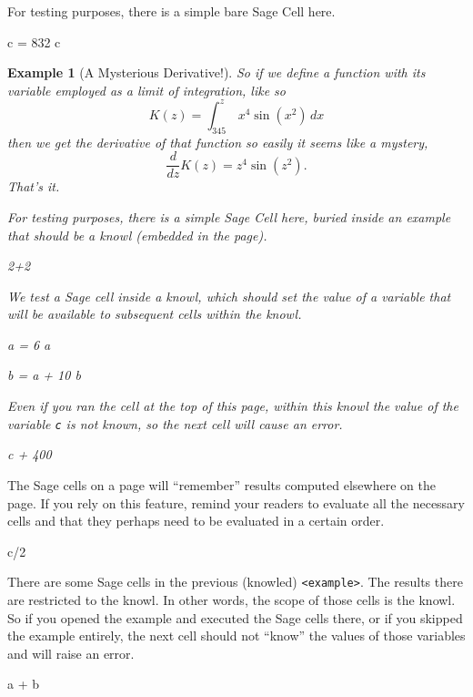 \documentclass{sn-jnl}
\theoremstyle{thmstyleone}%
\theoremstyle{thmstyletwo}%
\newtheorem{example}[theorem]{Example}
\theoremstyle{thmstylethree}%
\newcommand{\mono}[1]{\texttt{#1}}
\numberwithin{equation}{section}
\newcommand{\definiteintegral}[4]{\int_{#1}^{#2}\,#3\,d#4}
\begin{document}
For testing purposes, there is a simple bare Sage Cell here.%
\begin{sageinput}
c = 832
c
\end{sageinput}
\begin{example}[A Mysterious Derivative!]\label{example-mysterious}%
%
So if we define a function with its variable employed as a limit of integration, like so%
\begin{equation*}
K(z)=\definiteintegral{345}{z}{x^4\sin(x^2)}{x}
\end{equation*}
then we get the derivative of that function so easily it seems like a mystery,%
\begin{equation*}
\frac{d}{dz}K(z)=z^4\sin(z^2)\text{.}
\end{equation*}
That's it.%
\par
For testing purposes, there is a simple Sage Cell here, buried inside an example that should be a knowl (embedded in the page).%
\begin{sageinput}
2+2
\end{sageinput}
We test a Sage cell inside a knowl, which should set the value of a variable that will be available to subsequent cells within the knowl.%
\begin{sageinput}
a = 6
a
\end{sageinput}
\begin{sageinput}
b = a + 10
b
\end{sageinput}
Even if you ran the cell at the top of this page, within this knowl the value of the variable \mono{c} is not known, so the next cell will cause an error.%
\begin{sageinput}
c + 400
\end{sageinput}
\end{example}
The Sage cells on a page will ``remember'' results computed elsewhere on the page.  If you rely on this feature, remind your readers to evaluate all the necessary cells and that they perhaps need to be evaluated in a certain order.%
\begin{sageinput}
c/2
\end{sageinput}
There are some Sage cells in the previous (knowled) \mono{<example>}.  The results there are restricted to the knowl.  In other words, the scope of those cells is the knowl.  So if you opened the example and executed the Sage cells there, or if you skipped the example entirely, the next cell should not ``know'' the values of those variables and will raise an error.%
\begin{sageinput}
a + b
\end{sageinput}
\end{document}

